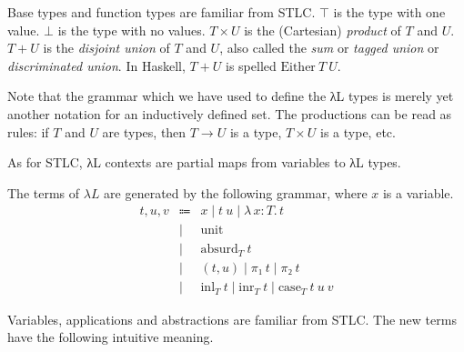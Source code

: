 \documentclass{scrartcl}
\theoremstyle{definition}
\newcommand{\Lam}[2]{λ\,#1.\, #2}
\newcommand{\unit}{\mathrm{unit}}
\newcommand{\absurd}{\mathrm{absurd}}
\newcommand{\inl}{\ensuremath{\mathrm{inl}}}
\newcommand{\inr}{\ensuremath{\mathrm{inr}}}
\newcommand{\case}{\mathrm{case}}
\begin{document}
Base types and function types are familiar from STLC.\@
$⊤$ is the type with one value.
$⊥$ is the type with no values.
$T × U$ is the (Cartesian) \emph{product} of $T$ and $U$.
$T + U$ is the \emph{disjoint union} of $T$ and $U$, also called the \emph{sum} or \emph{tagged union} or \emph{discriminated union}.
In Haskell, $T + U$ is spelled $\mathrm{Either}~T~U$.

Note that the grammar which we have used to define the λL types is merely yet another notation for an inductively defined set.
The productions can be read as rules: if $T$ and $U$ are types, then $T → U$ is a type, $T × U$ is a type, etc.

\begin{definition}[Contexts]
  As for STLC, λL contexts are partial maps from variables to λL types.
\end{definition}

\begin{definition}[Terms]
  The terms of $λL$ are generated by the following grammar, where $x$ is a variable.
  \begin{eqnarray*}
    t,u,v &\Coloneqq& x \mid t~u \mid \Lam{x : T}{t} \\
          &\mid& \unit \\
          &\mid& \absurd_{T}~t \\
          &\mid& (t,u) \mid π₁~t \mid π₂~t \\
          &\mid& \inl_{T}~t \mid \inr_{T}~t \mid \case_{T}~t~u~v
  \end{eqnarray*}
\end{definition}

Variables, applications and abstractions are familiar from STLC.\@
The new terms have the following intuitive meaning.
\end{document}
